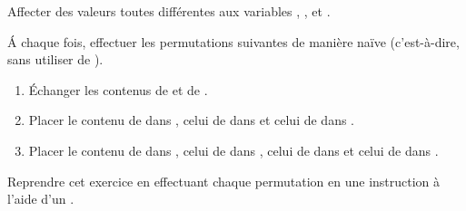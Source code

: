 Affecter des valeurs toutes différentes aux variables , ,  et .

\'A chaque fois, effectuer les permutations suivantes de manière naïve (c'est-à-dire, sans utiliser de ).
\begin{enumerate}[label=\emph{\alph*)}]
  \item \'Echanger les contenus de  et de .
  \item Placer le contenu de  dans , celui de  dans  et celui de  dans .
  \item Placer le contenu de  dans , celui de  dans , celui de  dans  et celui de  dans .
\end{enumerate}
Reprendre cet exercice en effectuant chaque permutation en une instruction à l'aide d'un .
